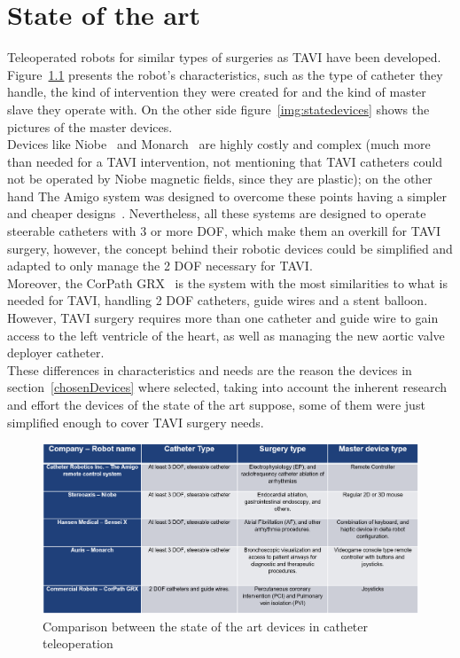 
\chapter{State of the art }\label{sec:stateoftheart}

Teleoperated robots for similar types of surgeries as TAVI have been developed. Figure~\ref{img:statetable} presents the robot's characteristics, such as the type of catheter they handle, the kind of intervention they were created for and the kind of master slave they operate with. On the other side figure~\ref{img:statedevices} shows the pictures of the master devices.\\

Devices like Niobe~\cite{stereoaxis} and Monarch~\cite{monarch} are highly costly and complex (much more than needed for a TAVI intervention, not mentioning that TAVI catheters could not be operated by Niobe magnetic fields, since they are plastic); on the other hand The Amigo system was designed to overcome these points having a simpler and cheaper designs~\cite{amigo}. Nevertheless, all these systems are designed to operate steerable catheters with 3 or more DOF, which make them an overkill for TAVI surgery, however, the concept behind their robotic devices could be simplified and adapted to only manage the 2 DOF necessary for TAVI.\\

Moreover, the CorPath GRX~\cite{corepath} is the system with the most similarities to what is needed for TAVI, handling 2 DOF catheters, guide wires and a stent balloon. However, TAVI surgery requires more than one catheter and guide wire to gain access to the left ventricle of the heart, as well as managing the new aortic valve deployer catheter.\\

These differences in characteristics and needs are the reason the devices in section~\ref{chosenDevices} where selected, taking into account the inherent research and effort the devices of the state of the art suppose, some of them were just simplified enough to cover TAVI surgery needs.\\

\begin{figure}[ht]
   \centering
   \includegraphics[width=1.0\textwidth]{img/statetable.PNG}
   \caption{Comparison between the state of the art devices in catheter teleoperation}
   \label{img:statetable}
\end{figure}

